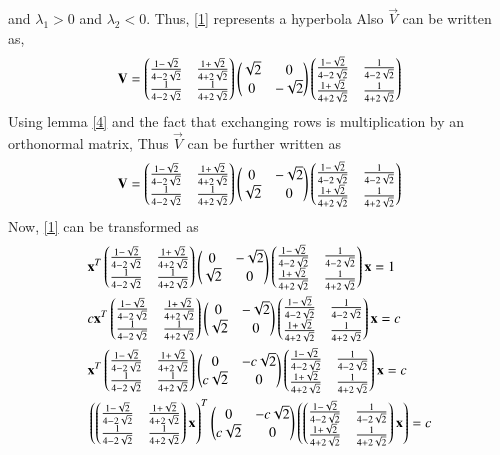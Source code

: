 \documentclass[journal,12pt,twocolumn]{IEEEtran}
\begin{document}
and $\lambda_1 >0$ and $\lambda_2< 0$. Thus, \eqref{1} represents a hyperbola
Also $\vec{V}$ can be written as,
\begin{align}
	\mathbf{V} = \begin{pmatrix}\frac{1-\sqrt{2}}{4-2\sqrt{2}} & \frac{1+\sqrt{2}}{4+2\sqrt{2}} \\ \frac{1}{4-2\sqrt{2}} & \frac{1}{4+2\sqrt{2}}\end{pmatrix} \begin{pmatrix}\sqrt{2} &0 \\ 0 & -\sqrt{2}\end{pmatrix} \begin{pmatrix}\frac{1-\sqrt{2}}{4-2\sqrt{2}} & \frac{1}{4-2\sqrt{2}}  \\ \frac{1+\sqrt{2}}{4+2\sqrt{2}} & \frac{1}{4+2\sqrt{2}}\end{pmatrix}
\end{align}
Using lemma \eqref{4} and the fact that exchanging rows is multiplication by an orthonormal matrix, Thus $\vec{V}$ can be further written as 
\begin{align}
	\mathbf{V} = \begin{pmatrix}\frac{1-\sqrt{2}}{4-2\sqrt{2}} & \frac{1+\sqrt{2}}{4+2\sqrt{2}} \\ \frac{1}{4-2\sqrt{2}} & \frac{1}{4+2\sqrt{2}}\end{pmatrix} \begin{pmatrix} 0 & -\sqrt{2}\\ \sqrt{2} & 0\end{pmatrix} \begin{pmatrix}\frac{1-\sqrt{2}}{4-2\sqrt{2}} & \frac{1}{4-2\sqrt{2}}  \\ \frac{1+\sqrt{2}}{4+2\sqrt{2}} & \frac{1}{4+2\sqrt{2}}\end{pmatrix}	
\end{align} 
Now, \eqref{1} can be transformed as
\begin{align}
& \mathbf{x}^T\begin{pmatrix}\frac{1-\sqrt{2}}{4-2\sqrt{2}} & \frac{1+\sqrt{2}}{4+2\sqrt{2}} \\ \frac{1}{4-2\sqrt{2}} & \frac{1}{4+2\sqrt{2}}\end{pmatrix} \begin{pmatrix}0 &-\sqrt{2}\\ \sqrt{2} & 0\end{pmatrix} \begin{pmatrix}\frac{1-\sqrt{2}}{4-2\sqrt{2}} & \frac{1}{4-2\sqrt{2}}  \\ \frac{1+\sqrt{2}}{4+2\sqrt{2}} & \frac{1}{4+2\sqrt{2}}\end{pmatrix}\mathbf{x} = 1 \\
& c\mathbf{x}^T\begin{pmatrix}\frac{1-\sqrt{2}}{4-2\sqrt{2}} & \frac{1+\sqrt{2}}{4+2\sqrt{2}} \\ \frac{1}{4-2\sqrt{2}} & \frac{1}{4+2\sqrt{2}}\end{pmatrix} \begin{pmatrix}0 & -\sqrt{2}\\ \sqrt{2} & 0\end{pmatrix} \begin{pmatrix}\frac{1-\sqrt{2}}{4-2\sqrt{2}} & \frac{1}{4-2\sqrt{2}}  \\ \frac{1+\sqrt{2}}{4+2\sqrt{2}} & \frac{1}{4+2\sqrt{2}}\end{pmatrix}\mathbf{x} = c \\
& \mathbf{x}^T\begin{pmatrix}\frac{1-\sqrt{2}}{4-2\sqrt{2}} & \frac{1+\sqrt{2}}{4+2\sqrt{2}} \\ \frac{1}{4-2\sqrt{2}} & \frac{1}{4+2\sqrt{2}}\end{pmatrix} \begin{pmatrix}0 & -c\sqrt{2}\\ c\sqrt{2} & 0\end{pmatrix} \begin{pmatrix}\frac{1-\sqrt{2}}{4-2\sqrt{2}} & \frac{1}{4-2\sqrt{2}}  \\ \frac{1+\sqrt{2}}{4+2\sqrt{2}} & \frac{1}{4+2\sqrt{2}}\end{pmatrix}\mathbf{x} = c \\
& \left(\begin{pmatrix}\frac{1-\sqrt{2}}{4-2\sqrt{2}} & \frac{1+\sqrt{2}}{4+2\sqrt{2}} \\ \frac{1}{4-2\sqrt{2}} & \frac{1}{4+2\sqrt{2}}\end{pmatrix}\mathbf{x}\right)^T\begin{pmatrix}0 & -c\sqrt{2}\\ c\sqrt{2} & 0\end{pmatrix}\left(\begin{pmatrix}\frac{1-\sqrt{2}}{4-2\sqrt{2}} & \frac{1}{4-2\sqrt{2}}  \\ \frac{1+\sqrt{2}}{4+2\sqrt{2}} & \frac{1}{4+2\sqrt{2}}\end{pmatrix}\mathbf{x}\right) = c \label{5}
\end{align} 
\end{document}
